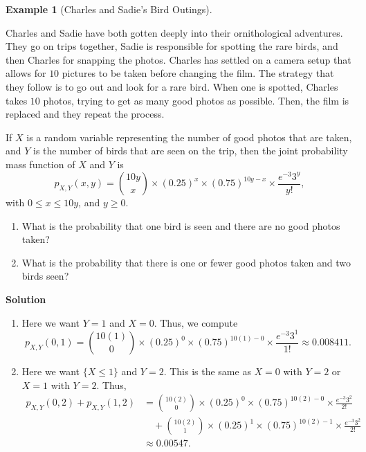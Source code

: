 \documentclass[
  letterpaper,
  DIV=11,
  numbers=noendperiod]{scrreprt}
\providecommand{\tightlist}{%
  \setlength{\itemsep}{0pt}\setlength{\parskip}{0pt}}\usepackage{longtable,booktabs,array}
\theoremstyle{definition}
\theoremstyle{definition}
\theoremstyle{definition}
\newtheorem{example}{Example}[chapter]
\theoremstyle{remark}
\begin{document}
\begin{example}[Charles and Sadie's Bird
Outings]\protect\hypertarget{exm-joint-pmf}{}\label{exm-joint-pmf}

Charles and Sadie have both gotten deeply into their ornithological
adventures. They go on trips together, Sadie is responsible for spotting
the rare birds, and then Charles for snapping the photos. Charles has
settled on a camera setup that allows for \(10\) pictures to be taken
before changing the film. The strategy that they follow is to go out and
look for a rare bird. When one is spotted, Charles takes \(10\) photos,
trying to get as many good photos as possible. Then, the film is
replaced and they repeat the process.

If \(X\) is a random variable representing the number of good photos
that are taken, and \(Y\) is the number of birds that are seen on the
trip, then the joint probability mass function of \(X\) and \(Y\) is
\[p_{X,Y}(x, y) = \binom{10y}{x}\times(0.25)^{x}\times(0.75)^{10y - x}\times\frac{e^{-3}3^y}{y!},\]
with \(0 \leq x \leq 10y\), and \(y \geq 0\).

\begin{enumerate}
\def\labelenumi{\alph{enumi}.}
\tightlist
\item
  What is the probability that one bird is seen and there are no good
  photos taken?
\item
  What is the probability that there is one or fewer good photos taken
  and two birds seen?
\end{enumerate}

\begin{tcolorbox}[enhanced jigsaw, colback=white, breakable, rightrule=.15mm, leftrule=.75mm, toprule=.15mm, left=2mm, arc=.35mm, opacityback=0, bottomrule=.15mm]

\vspace{-3mm}\textbf{Solution}\vspace{3mm}

\begin{enumerate}
\def\labelenumi{\alph{enumi}.}
\item
  Here we want \(Y = 1\) and \(X = 0\). Thus, we compute
  \[p_{X,Y}(0, 1) = \binom{10(1)}{0}\times(0.25)^{0}\times(0.75)^{10(1) - 0}\times\frac{e^{-3}3^1}{1!} \approx 0.008411.\]
\item
  Here we want \(\{X \leq 1\}\) and \(Y = 2\). This is the same as
  \(X = 0\) with \(Y = 2\) or \(X = 1\) with \(Y = 2\). Thus,
  \begin{align*}
  p_{X,Y}(0,2) + p_{X,Y}(1,2) &= \binom{10(2)}{0}\times(0.25)^{0}\times(0.75)^{10(2) - 0}\times\frac{e^{-3}3^2}{2!} \\
  &\quad + \binom{10(2)}{1}\times(0.25)^{1}\times(0.75)^{10(2) - 1}\times\frac{e^{-3}3^2}{2!} \\
  &\approx 0.00547.\end{align*}
\end{enumerate}

\end{tcolorbox}

\end{example}
\end{document}
